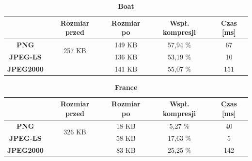 \begin{table}[!h]
	\centering
	\caption{\textbf{Boat}}
	\label{my-label}
	\begin{tabular}{|c|c|c|c|c|}                                             
		\hline
		& \textbf{Rozmiar przed} & \textbf{Rozmiar po} & \textbf{Wspł. kompresji} & \textbf{Czas {[}ms{]}} \\ \hline 
		\textbf{PNG}      &          \multicolumn{1}{c|}{\multirow{2}{*}{257 KB}}             &       149 KB              &      57,94 \%                    &           67                  \\\cline{3-5}
		\textbf{JPEG-LS}  &                        &       136 KB              &         53,19 \%                &         10                 \\\cline{3-5}
		\textbf{JPEG2000} &                        &      141 KB               &        55,07 \%                &        151              \\ \hline
	\end{tabular}
\end{table}

\begin{table}[!h]
	\centering
	\caption{\textbf{France}}
	\label{my-label}
	\begin{tabular}{|c|c|c|c|c|}                                             
		\hline
		& \textbf{Rozmiar przed} & \textbf{Rozmiar po} & \textbf{Wspł. kompresji} & \textbf{Czas {[}ms{]}} \\ \hline 
		\textbf{PNG}      &          \multicolumn{1}{c|}{\multirow{2}{*}{326 KB}}             &     18  KB              &    5,27 \%                     &            40                 \\\cline{3-5}
		\textbf{JPEG-LS}  &                        &        58 KB             &       17,63 \%                  &          5                \\\cline{3-5}
		\textbf{JPEG2000} &                        &     83 KB                &      25,25 \%                   &         142             \\ \hline
	\end{tabular}
\end{table}

